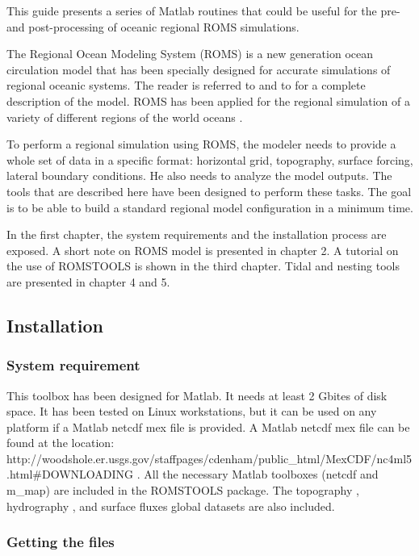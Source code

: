 This guide presents a series of Matlab routines that 
could be useful for the pre- and post-processing of oceanic
regional ROMS simulations.

The Regional Ocean Modeling System (ROMS) is a new
generation ocean circulation model \citep{Shc03b}
that has been specially designed for accurate simulations
of regional oceanic systems.
The reader is referred to \citet{Shc03a} and to 
\citet{Shc03b} for a complete description of the model.
ROMS has been applied for the regional simulation of a 
variety of different regions of the world oceans 
\citep[e.g.][]{Bla02,Dil03,Hai00,Mac02,Mar03,Pen01}.

To perform a regional simulation using ROMS, the modeler needs
to provide a whole set of data in a specific format:
horizontal grid, topography, surface forcing,
lateral boundary conditions. He also needs to analyze
the model outputs. The tools that are described here
have been designed to perform these tasks.
The goal is to be able to build a standard
regional model configuration in a minimum time. 

In the first chapter, the system requirements and
the installation process are exposed. 
A short  note on ROMS model is presented in 
chapter 2.
A tutorial on the use of
ROMSTOOLS is shown in the third chapter.
Tidal and nesting tools are presented in chapter 4 and 5.

\subsection{Installation}

\subsubsection{System requirement}

This toolbox has been designed for Matlab.
It needs at least 2 Gbites of disk space.
It has been tested on Linux workstations, but it 
can be used on any platform if a Matlab netcdf mex file is
provided.
A Matlab netcdf mex file can be found at 
the location: \\
{\small
http://woodshole.er.usgs.gov/staffpages/cdenham/public\_html/MexCDF/nc4ml5.html\#DOWNLOADING
}. All the necessary Matlab toolboxes (netcdf and m\_map) are included 
in the ROMSTOOLS package. The topography \citep{Smi97}, 
hydrography \citep{Con02}, 
and surface fluxes \citep{Das94}
global datasets are also included.

\subsubsection{Getting the files}

